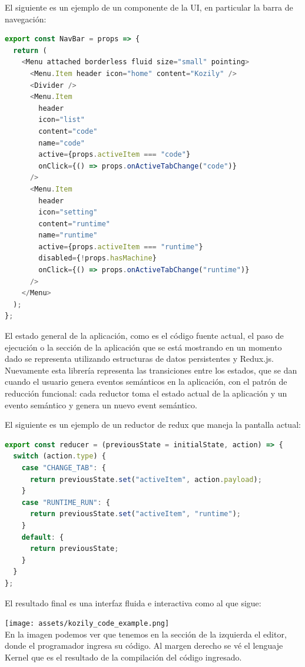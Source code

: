 \documentclass[a4paper,11pt]{article}
\begin{document}
El siguiente es un ejemplo de un componente de la UI, en particular la barra de navegación:

\begin{lstlisting}[language=javascript]
export const NavBar = props => {
  return (
    <Menu attached borderless fluid size="small" pointing>
      <Menu.Item header icon="home" content="Kozily" />
      <Divider />
      <Menu.Item
        header
        icon="list"
        content="code"
        name="code"
        active={props.activeItem === "code"}
        onClick={() => props.onActiveTabChange("code")}
      />
      <Menu.Item
        header
        icon="setting"
        content="runtime"
        name="runtime"
        active={props.activeItem === "runtime"}
        disabled={!props.hasMachine}
        onClick={() => props.onActiveTabChange("runtime")}
      />
    </Menu>
  );
};
\end{lstlisting}

El estado general de la aplicación, como es el código fuente actual, el paso de ejecución o la sección de la aplicación que se está mostrando en un momento dado se representa utilizando estructuras de datos persistentes y Redux.js\cite{redux}. Nuevamente esta librería representa las transiciones entre los estados, que se dan cuando el usuario genera eventos semánticos en la aplicación, con el patrón de reducción funcional: cada reductor toma el estado actual de la aplicación y un evento semántico y genera un nuevo event semántico.

El siguiente es un ejemplo de un reductor de redux que maneja la pantalla actual:

\begin{lstlisting}[language=javascript]
export const reducer = (previousState = initialState, action) => {
  switch (action.type) {
    case "CHANGE_TAB": {
      return previousState.set("activeItem", action.payload);
    }
    case "RUNTIME_RUN": {
      return previousState.set("activeItem", "runtime");
    }
    default: {
      return previousState;
    }
  }
};
\end{lstlisting}

El resultado final es una interfaz fluida e interactiva como al que sigue:

\texttt{[image: assets/kozily\_code\_example.png]}\\[1cm]

En la imagen podemos ver que tenemos en la sección de la izquierda el editor, donde el programador ingresa su código. Al margen derecho se vé el lenguaje Kernel que es el resultado de la compilación del código ingresado.
\end{document}
